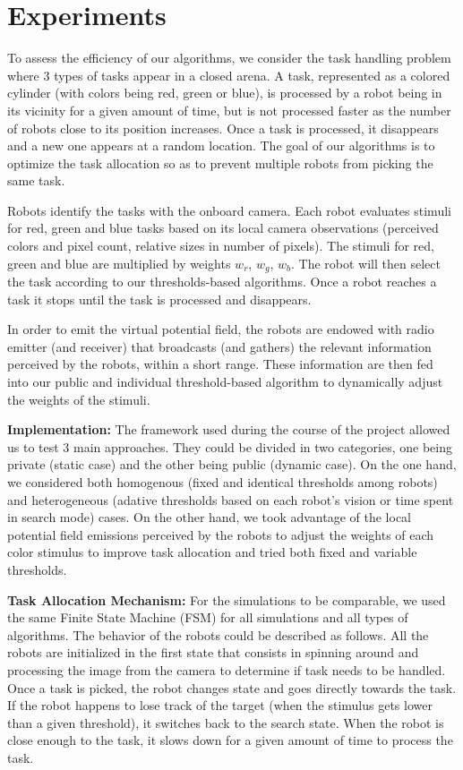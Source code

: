 \section{Experiments}
To assess the efficiency of our algorithms, we consider the task handling problem where 3 types of tasks appear in a closed arena. A task, represented as a colored cylinder (with colors being red, green or blue), is processed by a robot being in its vicinity for a given amount of time, but is not processed faster as the number of robots close to its position increases. Once a task is processed, it disappears and a new one appears at a random location. The goal of our algorithms is to optimize the task allocation so as to prevent multiple robots from picking the same task.

Robots identify the tasks with the onboard camera. Each robot evaluates stimuli for red, green and blue tasks based on its local camera observations (perceived colors and pixel count, relative sizes in number of pixels). The stimuli  for  red,  green  and blue  are  multiplied  by  weights $w_r$,  $w_g$,  $w_b$. The  robot  will  then select the  task according to our thresholds-based algorithms. Once a  robot reaches  a  task it stops until the task is processed and disappears.

In order to emit the virtual potential field, the robots are endowed with radio emitter (and receiver) that broadcasts (and gathers) the relevant information perceived by the robots, within a short range. These information are then fed into our public and individual threshold-based algorithm to dynamically adjust the weights of the stimuli.

\textbf{Implementation:}
The framework used during the course of the project allowed us to test 3 main approaches. They could be divided in two categories, one being private (static case) and the other being public (dynamic case). On the one hand, we considered both homogenous (fixed and identical thresholds among robots) and heterogeneous (adative thresholds based on each robot's vision or time spent in search mode) cases. On the other hand, we took advantage of the local potential field emissions perceived by the robots to adjust the weights of each color stimulus to improve task allocation and tried both fixed and variable thresholds.

\textbf{Task Allocation Mechanism:}
For the simulations to be comparable, we used the same Finite State Machine (FSM) for all simulations and all types of algorithms. The behavior of the robots could be described as follows. All the robots are initialized in the first state that consists in spinning around and processing the image from the camera to determine if task needs to be handled. Once a task is picked, the robot changes state and goes directly towards the task. If the robot happens to lose track of the target (when the stimulus gets lower than a given threshold), it switches back to the search state. When the robot is close enough to the task, it slows down for a given amount of time to process the task.


